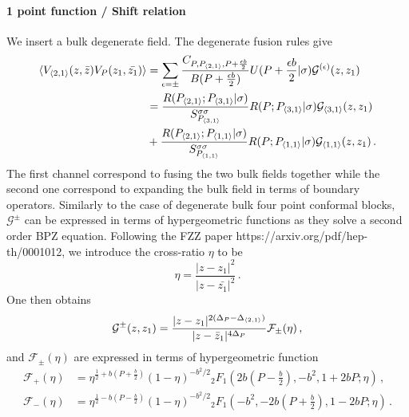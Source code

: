 \documentclass[a4paper]{article}
\begin{document}
\paragraph{1 point function / Shift relation}
We insert a bulk degenerate field. The degenerate fusion rules give
\begin{equation}
  \begin{aligned}
    \braket{V_{\braket{2,1}}(z,\bar{z})V_{P}(z_1,\bar{z_1})}
    &=\sum_{\epsilon = \pm} \frac{C_{P,P_{\braket{2,1}},P+\frac{\epsilon b }{2}}}{B(P+\frac{\epsilon b}{2})} U(P+\frac{\epsilon b}{2}|\sigma) \mathcal{G}^{(\epsilon)}(z,z_1)\\
    &=\frac{R(P_{\braket{2,1}};P_{\braket{3,1}}|\sigma)}{S_{P_{\braket{3,1}}}^{\sigma \sigma}} R(P;P_{\braket{3,1}}|\sigma)\mathcal{G}_{\braket{3,1}}(z,z_1)\\
    &+\frac{R(P_{\braket{2,1}};P_{\braket{1,1}}|\sigma)}{S_{P_{\braket{1,1}}}^{\sigma \sigma}}R(P;P_{\braket{1,1}}|\sigma)\mathcal{G}_{\braket{1,1}}(z,z_1)\,.
  \end{aligned}
\end{equation}
The first channel correspond to fusing the two bulk fields together while the second one correspond to expanding the bulk field in terms of boundary operators. Similarly to the case of degenerate bulk four point conformal blocks, $\mathcal{G}^{\pm}$ can be expressed in terms of hypergeometric functions as they solve a second order BPZ equation. Following the FZZ paper https://arxiv.org/pdf/hep-th/0001012, we introduce the cross-ratio $\eta$ to be
\begin{equation}
  \eta = \frac{|z-z_1|^2}{|z-\bar{z_1}|^2}\,.
\end{equation}
One then obtains
\begin{equation}
  \begin{aligned}
    \mathcal{G}^{\pm}(z,z_1) = \frac{|z-z_1|^{2(\Delta_P-\Delta_{\braket{2,1}})}}{|z-\bar{z}_1|^{4\Delta_P}}\mathcal{F}_{\pm}(\eta)\,,
  \end{aligned}
\end{equation}
and $\mathcal{F}_{\pm}(\eta)$ are expressed in terms of hypergeometric function
\begin{equation}
  \begin{aligned}
    \mathcal{F}_{+}(\eta) &= \eta^{\frac{1}{2}+b\left(P+\frac{b}{2}\right)}(1-\eta)^{-b^2/2} {}_2 F_1 \left(2b\left(P-\frac{b}{2}\right), -b^2, 1+2bP; \eta\right)\,,\\
    \mathcal{F}_{-}(\eta) &= \eta^{\frac{1}{2}-b\left(P-\frac{b}{2}\right)}(1-\eta)^{-b^2/2} {}_2 F_1 \left(-b^2, -2b\left(P+\frac{b}{2}\right), 1-2bP; \eta\right)\,.
  \end{aligned}
\end{equation}
\end{document}
